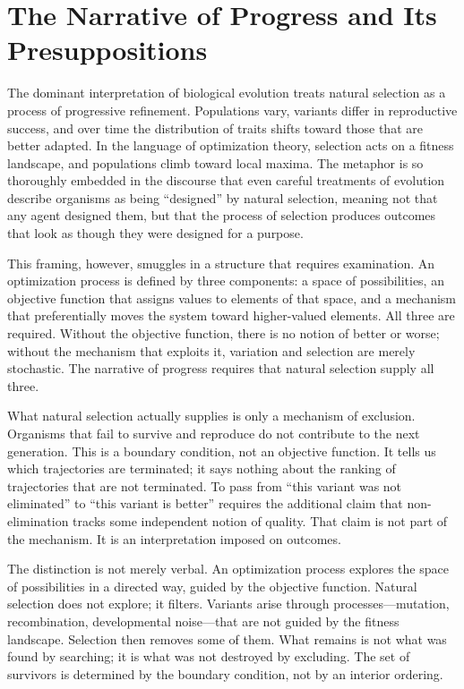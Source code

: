 \documentclass[12pt, a4paper, oneside]{article}
\theoremstyle{plain}
\theoremstyle{definition}
\theoremstyle{remark}
\begin{document}
\setcounter{section}{0}

\section{The Narrative of Progress and Its Presuppositions}

The dominant interpretation of biological evolution treats natural selection as a process of progressive refinement. Populations vary, variants differ in reproductive success, and over time the distribution of traits shifts toward those that are better adapted. In the language of optimization theory, selection acts on a fitness landscape, and populations climb toward local maxima. The metaphor is so thoroughly embedded in the discourse that even careful treatments of evolution describe organisms as being ``designed'' by natural selection, meaning not that any agent designed them, but that the process of selection produces outcomes that look as though they were designed for a purpose.

This framing, however, smuggles in a structure that requires examination. An optimization process is defined by three components: a space of possibilities, an objective function that assigns values to elements of that space, and a mechanism that preferentially moves the system toward higher-valued elements. All three are required. Without the objective function, there is no notion of better or worse; without the mechanism that exploits it, variation and selection are merely stochastic. The narrative of progress requires that natural selection supply all three.

What natural selection actually supplies is only a mechanism of exclusion. Organisms that fail to survive and reproduce do not contribute to the next generation. This is a boundary condition, not an objective function. It tells us which trajectories are terminated; it says nothing about the ranking of trajectories that are not terminated. To pass from ``this variant was not eliminated'' to ``this variant is better'' requires the additional claim that non-elimination tracks some independent notion of quality. That claim is not part of the mechanism. It is an interpretation imposed on outcomes.

The distinction is not merely verbal. An optimization process explores the space of possibilities in a directed way, guided by the objective function. Natural selection does not explore; it filters. Variants arise through processes---mutation, recombination, developmental noise---that are not guided by the fitness landscape. Selection then removes some of them. What remains is not what was found by searching; it is what was not destroyed by excluding. The set of survivors is determined by the boundary condition, not by an interior ordering.
\end{document}
